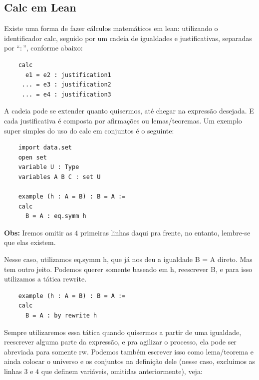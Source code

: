   \subsection{Calc em Lean}
  Existe uma forma de fazer cálculos matemáticos em lean: utilizando o identificador calc, seguido por um cadeia de igualdades e justificativas, separadas por ``$:$'', conforme abaixo:

  \begin{lstlisting}
    calc
      e1 = e2 : justification1
     ... = e3 : justification2
     ... = e4 : justification3 \end{lstlisting}

  A cadeia pode se extender quanto quisermos, até chegar na expressão desejada. E cada justificativa é composta por afirmações ou lemas/teoremas. Um exemplo super simples do uso do {\selectfont calc} em conjuntos é o seguinte:

  \begin{lstlisting}
    import data.set
    open set
    variable U : Type
    variables A B C : set U

    example (h : A = B) : B = A :=
    calc
      B = A : eq.symm h \end{lstlisting}

  \textbf{Obs:} Iremos omitir as $4$ primeiras linhas daqui pra frente, no entanto, lembre-se que elas existem.

  Nesse caso, utilizamos {\selectfont eq.symm h}, que já nos deu a igualdade {\selectfont B = A} direto. Mas tem outro jeito. Podemos querer somente baseado em {\selectfont h}, reescrever {\selectfont B}, e para isso utilizamos a tática {\selectfont rewrite}.

  \begin{lstlisting}
    example (h : A = B) : B = A :=
    calc
      B = A : by rewrite h \end{lstlisting}

  Sempre utilizaremos essa tática quando quisermos a partir de uma igualdade, reescrever alguma parte da expressão, e pra agilizar o processo, ela pode ser abreviada para somente {\selectfont rw}.
  Podemos também escrever isso como lema/teorema e ainda colocar o universo e os conjuntos na definição dele (nesse caso, excluimos as linhas $3$ e $4$ que definem variáveis, omitidas anteriormente), veja:

